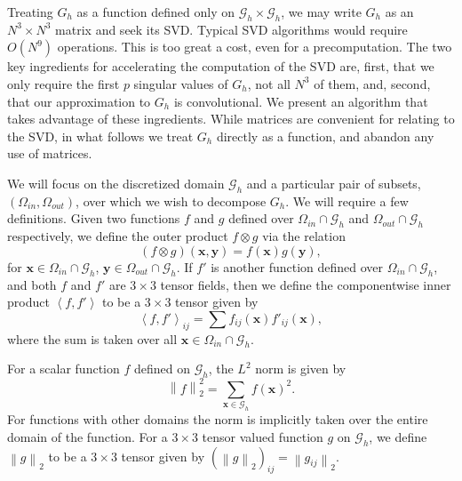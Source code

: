 \documentclass[preprint,12pt]{elsarticle}
\newcommand{\norm}[1]{\left\lVert#1\right\rVert}
\newcommand{\B}[1]{\mathbf{#1}}
\newcommand{\C}[1]{\mathcal{#1}}
\newcommand{\LL}{\left\langle}
\newcommand{\RR}{\right\rangle}
\begin{document}
Treating $G_h$ as a function defined only on $\C{G}_h\times \C{G}_h$, we may write $G_h$ as an $N^3\times N^3$ matrix and seek its SVD. Typical SVD algorithms would require $O(N^9)$ operations. This is too great a cost, even for a precomputation. The two key ingredients for accelerating the computation of the SVD are, first, that we only require the first $p$ singular values of $G_h$, not all $N^3$ of them, and, second, that our approximation to $G_h$ is convolutional. We present an algorithm that takes advantage of these ingredients. While matrices are convenient for relating to the SVD, in what follows we treat $G_h$ directly as a function, and abandon any use of matrices.

We will focus on the discretized domain $\C{G}_h$ and a particular pair of subsets, $\left(\Omega_{in}, \Omega_{out}\right)$, over which we wish to decompose $G_h$. We will require a few definitions.
Given two functions $f$ and $g$ defined over $\Omega_{in}\cap\C{G}_h$ and $\Omega_{out}\cap\C{G}_h$ respectively, we define the outer product $f\otimes g$ via the relation
\begin{equation}
\left(f\otimes g\right)(\B{x},\B{y}) = f(\B{x})g(\B{y}),
\end{equation}
for $\B{x}\in\Omega_{in}\cap\C{G}_h$, $\B{y}\in\Omega_{out}\cap\C{G}_h$. If $f'$ is another function defined over $\Omega_{in}\cap\C{G}_h$, and both $f$ and $f'$ are $3\times 3$ tensor fields, then we define the componentwise inner product $\LL f, f' \RR$ to be a $3\times 3$ tensor given by
\begin{equation}
\LL f, f' \RR_{ij} = \sum f_{ij}(\B{x})f'_{ij}(\B{x}), 
\end{equation}
where the sum is taken over all $\B{x}\in\Omega_{in}\cap\C{G}_h$.

For a scalar function $f$ defined on $\C{G}_h$, the $L^2$ norm is given by
\begin{equation}
\norm{f}_2^2 = \sum_{\B{x}\in\C{G}_h} f(\B{x})^2.
\end{equation}
For functions with other domains the norm is implicitly taken over the entire domain of the function.
For a $3\times 3$ tensor valued function $g$ on $\C{G}_h$, we define $\norm{g}_2$ to be a $3\times 3$ tensor given by $\left(\norm{g}_2\right)_{ij} = \norm{g_{ij}}_2$. 
\end{document}
